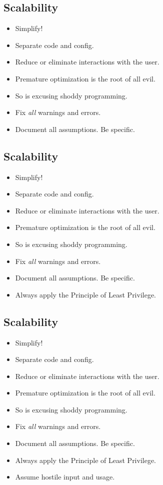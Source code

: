 \documentclass[xga]{xdvislides}
\begin{document}
\subsection{Scalability}
\begin{itemize}
	\item Simplify!
	\item Separate code and config.
	\item Reduce or eliminate interactions with the user.
	\item Premature optimization is the root of all evil.
	\item So is excusing shoddy programming.
	\item Fix {\em all} warnings and errors.
	\item Document all assumptions.  Be specific.
\end{itemize}

\subsection{Scalability}
\begin{itemize}
	\item Simplify!
	\item Separate code and config.
	\item Reduce or eliminate interactions with the user.
	\item Premature optimization is the root of all evil.
	\item So is excusing shoddy programming.
	\item Fix {\em all} warnings and errors.
	\item Document all assumptions.  Be specific.
	\item Always apply the Principle of Least Privilege.
\end{itemize}

\subsection{Scalability}
\begin{itemize}
	\item Simplify!
	\item Separate code and config.
	\item Reduce or eliminate interactions with the user.
	\item Premature optimization is the root of all evil.
	\item So is excusing shoddy programming.
	\item Fix {\em all} warnings and errors.
	\item Document all assumptions.  Be specific.
	\item Always apply the Principle of Least Privilege.
	\item Assume hostile input and usage.
\end{itemize}
\end{document}
